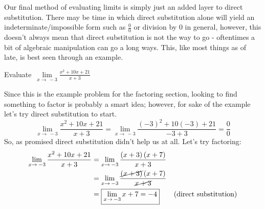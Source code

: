 \documentclass[addpoints]{exam}
\begin{document}
  \begin{tcolorbox}[breakable, title=FACTORING, colframe=black, sharp corners, colback=white, colbacktitle=white, coltitle=black]
    Our final method of evaluating limits is simply just an added layer to direct substitution. There may be time in which direct substitution alone will yield an indeterminate/impossible form such as $\frac{0}{0}$ or division by $0$ in general, however, this doesn't always mean that direct substitution is not the way to go - oftentimes a bit of algebraic manipulation can go a long ways. This, like most things as of late, is best seen through an example.
  \end{tcolorbox}
  \begin{questions}
    \question Evaluate $\displaystyle\, \lim\limits_{x\to\,-3} \frac{x^2+10x+21}{x+3}$
    \begin{solution}[2.5in]
      Since this is the example problem for the factoring section, looking to find something to factor is probably a smart idea; however, for sake of the example let's try direct substitution to start. 
      \[
        \lim\limits_{x\to\,-3}\frac{x^2+10x+21}{x+3} = \lim\limits_{x\to\,-3}\frac{\left(-3\right)^2 + 10(-3) + 21}{-3+3} = \frac{0}{0}
      \]
      So, as promised direct substitution didn't help us at all. Let's try factoring:
      \begin{align*}
        \lim\limits_{x\to\,-3}\frac{x^2+10x+21}{x+3} &= \lim\limits_{x\to\,-3}\frac{\left(x+3\right)\left(x+7\right)}{x+3} \\ 
        &= \lim\limits_{x\to\,-3}\frac{\cancel{\left(x+3\right)}\left(x+7\right)}{\cancel{x+3}} \\
        &= \boxed{\lim\limits_{x\to\,-3}x+7 = -4} \tag{direct substitution}
      \end{align*}
    \end{solution}
  \end{questions}
\end{document}
